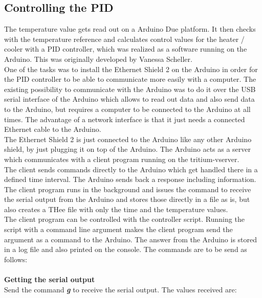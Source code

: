 \documentclass[12pt]{scrartcl}
\begin{document}
      \subsection{Controlling the PID} \label{sec:control}
      The temperature value gets read out on a Arduino Due platform. It then
      checks with the temperature reference and calculates control values
      for the heater / cooler with a PID controller, which was realized as a
      software running on the Arduino. This was originally developed by Vanessa
      Scheller.
      \\One of the tasks was to install the Ethernet Shield 2 on the Arduino in
      order for the PID controller to be able to communicate more easily with
      a computer. The existing possibility to communicate with the Arduino was
      to do it over the USB serial interface of the Arduino which allows to
      read out data and also send data to the Arduino, but requires a computer
      to be connected to the Arduino at all times. The advantage of a network
      interface is that it just needs a connected Ethernet cable to the Arduino.
      \\The Ethernet Shield 2 is just connected to the Arduino like any other
      Arduino shield, by just plugging it on top of the Arduino. The Arduino
      acts as a server which communicates with a client program
       running on the tritium-vserver.
      \\The client sends commands directly to the Arduino which get handled
      there in a defined time interval. The Arduino sends back a response
      including information.
      \\The client program runs in the background and issues the command to
      receive the serial output from the Arduino and stores those directly in
      a file as is, but also creates a THee file with only the time and the
      temperature values.
      \\The client program can be controlled with the
      controller script. Running the script with a
      command line argument makes the client program send the argument as a
      command to the Arduino. The answer from the Arduino is stored in a log
      file and also printed on the console.
      The commands are to be send as follows:
      \\\\
      \textbf{Getting the serial output} \\
      Send the command \textbf{\textit{g}} to receive the serial output. The values
      received are:
\end{document}
